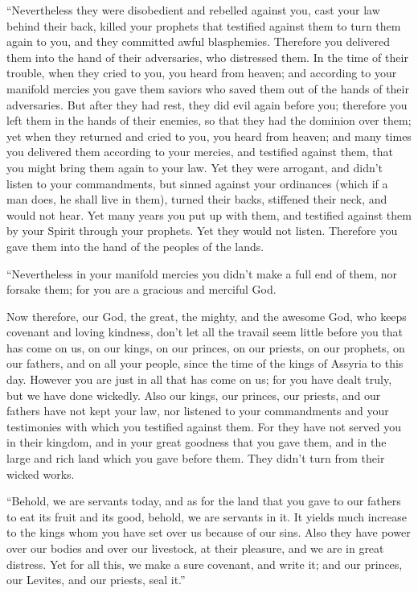  ``Nevertheless they were disobedient and rebelled against
you, cast your law behind their back, killed your prophets that
testified against them to turn them again to you, and they committed
awful blasphemies.  Therefore you delivered them into the
hand of their adversaries, who distressed them. In the time of their
trouble, when they cried to you, you heard from heaven; and according to
your manifold mercies you gave them saviors who saved them out of the
hands of their adversaries.  But after they had rest, they
did evil again before you; therefore you left them in the hands of their
enemies, so that they had the dominion over them; yet when they returned
and cried to you, you heard from heaven; and many times you delivered
them according to your mercies,  and testified against
them, that you might bring them again to your law. Yet they were
arrogant, and didn't listen to your commandments, but sinned against
your ordinances (which if a man does, he shall live in them), turned
their backs, stiffened their neck, and would not hear.  Yet
many years you put up with them, and testified against them by your
Spirit through your prophets. Yet they would not listen. Therefore you
gave them into the hand of the peoples of the lands.

 ``Nevertheless in your manifold mercies you didn't make a
full end of them, nor forsake them; for you are a gracious and merciful
God.

 Now therefore, our God, the great, the mighty, and the
awesome God, who keeps covenant and loving kindness, don't let all the
travail seem little before you that has come on us, on our kings, on our
princes, on our priests, on our prophets, on our fathers, and on all
your people, since the time of the kings of Assyria to this day.
 However you are just in all that has come on us; for you
have dealt truly, but we have done wickedly.  Also our
kings, our princes, our priests, and our fathers have not kept your law,
nor listened to your commandments and your testimonies with which you
testified against them.  For they have not served you in
their kingdom, and in your great goodness that you gave them, and in the
large and rich land which you gave before them. They didn't turn from
their wicked works.

 ``Behold, we are servants today, and as for the land that
you gave to our fathers to eat its fruit and its good, behold, we are
servants in it.  It yields much increase to the kings whom
you have set over us because of our sins. Also they have power over our
bodies and over our livestock, at their pleasure, and we are in great
distress.  Yet for all this, we make a sure covenant, and
write it; and our princes, our Levites, and our priests, seal it.''

